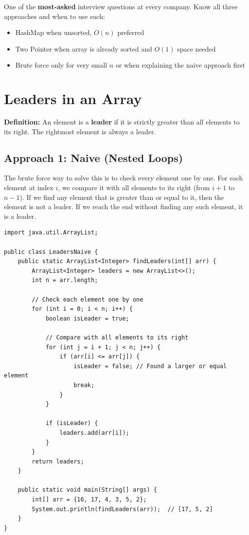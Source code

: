 \documentclass[12pt,a4paper,oneside]{book}
\begin{document}
\begin{interviewcorner}
One of the \textbf{most-asked} interview questions at every company. Know all three approaches and when to use each:
\begin{itemize}
  \item HashMap when unsorted, $O(n)$ preferred
  \item Two Pointer when array is already sorted and $O(1)$ space needed
  \item Brute force only for very small $n$ or when explaining the naive approach first
\end{itemize}
\end{interviewcorner}

\section{Leaders in an Array}

\textbf{Definition:} An element is a \textbf{leader} if it is strictly greater than all elements to its right. The rightmost element is always a leader.

\subsection{Approach 1: Naive (Nested Loops)}
The brute force way to solve this is to check every element one by one. For each element at index $i$, we compare it with all elements to its right (from $i+1$ to $n-1$). If we find any element that is greater than or equal to it, then the element is not a leader. If we reach the end without finding any such element, it is a leader.

\begin{lstlisting}[caption={Leaders in Array --- Naive nested loops, O(n$^2$)}]
import java.util.ArrayList;

public class LeadersNaive {
    public static ArrayList<Integer> findLeaders(int[] arr) {
        ArrayList<Integer> leaders = new ArrayList<>();
        int n = arr.length;

        // Check each element one by one
        for (int i = 0; i < n; i++) {
            boolean isLeader = true;
            
            // Compare with all elements to its right
            for (int j = i + 1; j < n; j++) {
                if (arr[i] <= arr[j]) {
                    isLeader = false; // Found a larger or equal element
                    break;
                }
            }
            
            if (isLeader) {
                leaders.add(arr[i]);
            }
        }
        return leaders;
    }

    public static void main(String[] args) {
        int[] arr = {16, 17, 4, 3, 5, 2};
        System.out.println(findLeaders(arr));  // [17, 5, 2]
    }
}
\end{lstlisting}
\end{document}
